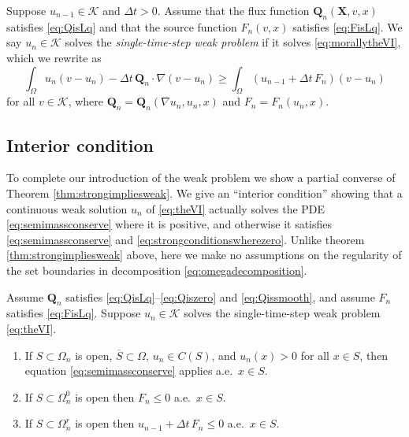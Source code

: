 \documentclass[final,leqno,onefignum,onetabnum]{siamltex1213bueler}
\newcommand\bQ{\mathbf{Q}}
\newcommand\bX{\mathbf{X}}
\renewcommand{\grad}{\nabla}
\begin{document}
\medskip
\begin{definition}  Suppose $u_{n-1}\in\mathcal{K}$ and $\Delta t>0$.  Assume that the flux function $\bQ_n(\bX,v,x)$ satisfies \eqref{eq:QisLq} and that the source function $F_n(v,x)$ satisfies \eqref{eq:FisLq}.  We say $u_n \in \mathcal{K}$ solves the \emph{single-time-step weak problem} if it solves \eqref{eq:morallytheVI}, which we rewrite as
\begin{equation}
\int_{\Omega} u_n (v-u_n) - \Delta t\, \bQ_n \cdot \grad(v-u_n) \ge \int_{\Omega} \left(u_{n-1} + \Delta t\, F_n\right) (v-u_n)  \label{eq:theVI}
\end{equation}
for all $v \in \mathcal{K}$, where $\bQ_n=\bQ_n(\grad u_n,u_n,x)$ and $F_n = F_n(u_n,x)$.
\end{definition}

\subsection{Interior condition}  \label{subsec:interior}  To complete our introduction of the weak problem we show a partial converse of Theorem \ref{thm:strongimpliesweak}.  We give an ``interior condition'' showing that a continuous weak solution $u_n$ of \eqref{eq:theVI} actually solves the PDE \eqref{eq:semimassconserve} where it is positive, and otherwise it satisfies \eqref{eq:semimassconserve} and \eqref{eq:strongconditionswherezero}.  Unlike theorem \ref{thm:strongimpliesweak} above, here we make no assumptions on the regularity of the set boundaries in decomposition \eqref{eq:omegadecomposition}.

\medskip
\begin{theorem} \label{thm:weakimpliesstrong}  Assume $\bQ_n$ satisfies \eqref{eq:QisLq}--\eqref{eq:Qiszero} and \eqref{eq:Qissmooth}, and assume $F_n$ satisfies \eqref{eq:FisLq}.  Suppose $u_n\in\mathcal{K}$ solves the single-time-step weak problem \eqref{eq:theVI}.
\renewcommand{\labelenumi}{\emph{(\roman{enumi})}}
\begin{enumerate}
\item If $S \subset \Omega_n$ is open, $\overline{S}\subset \Omega$, $u_n\in C(S)$, and $u_n(x)>0$ for all $x\in S$, then equation \eqref{eq:semimassconserve} applies a.e.~$x\in S$.
\item If $S \subset \Omega_n^0$ is open then $F_n \le 0$ a.e.~$x\in S$.
\item If $S \subset \Omega_n^r$ is open then $u_{n-1} + \Delta t\,F_n \le 0$ a.e.~$x\in S$.
\end{enumerate}
\end{theorem}
\end{document}
